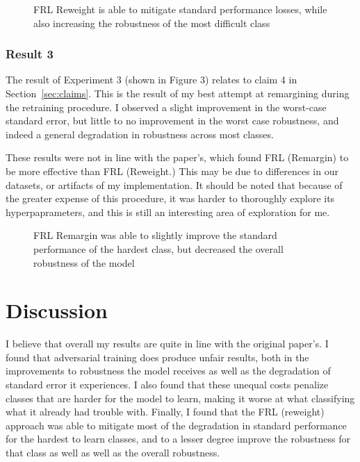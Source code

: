 \begin{figure}%
    \centering
    \qquad
    \caption{FRL Reweight is able to mitigate standard performance losses, while also increasing the robustness of the most difficult class}%
    \label{fig:example}%
\end{figure}

\subsubsection{Result 3}

The result of Experiment 3 (shown in Figure 3) relates to claim 4 in Section~\ref{sec:claims}. This is the result of my best attempt at remargining during the retraining procedure. I observed a slight improvement in the worst-case standard error, but little to no improvement in the worst case robustness, and indeed a general degradation in  robustness across most classes. 

These results were not in line with the paper's, which found FRL (Remargin) to be more effective than FRL (Reweight.) This may be due to differences in our datasets, or artifacts of my implementation. It should be noted that because of the greater expense of this procedure, it was harder to thoroughly explore its hyperpaprameters, and this is still an interesting area of exploration for me. 

\begin{figure}%
    \centering
    \qquad
    \caption{FRL Remargin was able to slightly improve the standard performance of the hardest class, but decreased the overall robustness of the model}%
    \label{fig:example}%
\end{figure}

\section{Discussion}

I believe that overall my results are quite in line with the original paper's. I found that adversarial training does produce unfair results, both in the improvements to robustness the model receives as well as the degradation of standard error it experiences. I also found that these unequal costs penalize classes that are harder for the model to learn, making it worse at what classifying what it already had trouble with. Finally, I found that the FRL (reweight) approach was able to mitigate most of the degradation in standard performance for the hardest to learn classes, and to a lesser degree improve the robustness for that class as well as well as the overall robustness. 

